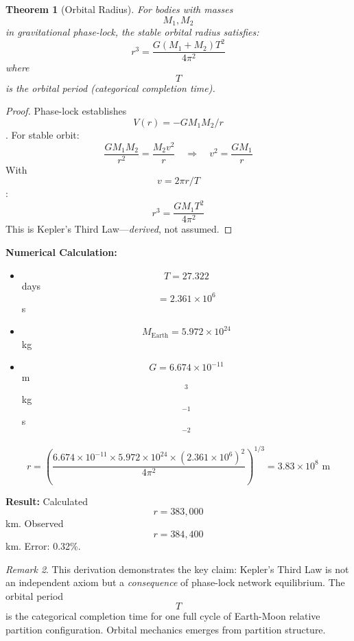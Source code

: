 \documentclass[11pt,twocolumn,a4paper]{article}
\newtheorem{theorem}{Theorem}[section]
\theoremstyle{definition}
\theoremstyle{remark}
\newtheorem{remark}[theorem]{Remark}
\begin{document}
\begin{theorem}[Orbital Radius]
\label{thm:orbit}
For bodies with masses $$M_1, M_2$$ in gravitational phase-lock, the stable orbital radius satisfies:
\begin{equation}
r^3 = \frac{G(M_1 + M_2) T^2}{4\pi^2}
\end{equation}
where $$T$$ is the orbital period (categorical completion time).
\end{theorem}

\begin{proof}
Phase-lock establishes $$V(r) = -GM_1 M_2/r$$. For stable orbit:
\begin{equation}
\frac{GM_1 M_2}{r^2} = \frac{M_2 v^2}{r} \quad \Rightarrow \quad v^2 = \frac{GM_1}{r}
\end{equation}
With $$v = 2\pi r/T$$:
\begin{equation}
r^3 = \frac{GM_1 T^2}{4\pi^2}
\end{equation}
This is Kepler's Third Law---\emph{derived}, not assumed.
\end{proof}

\textbf{Numerical Calculation:}
\begin{itemize}
    \item $$T = 27.322$$ days $$= 2.361 \times 10^6$$ s
    \item $$M_{\text{Earth}} = 5.972 \times 10^{24}$$ kg
    \item $$G = 6.674 \times 10^{-11}$$ m$$^3$$ kg$$^{-1}$$ s$$^{-2}$$
\end{itemize}

\begin{equation}
r = \left(\frac{6.674 \times 10^{-11} \times 5.972 \times 10^{24} \times (2.361 \times 10^6)^2}{4\pi^2}\right)^{1/3} = 3.83 \times 10^8 \text{ m}
\end{equation}

\textbf{Result:} Calculated $$r = 383{,}000$$ km. Observed $$r = 384{,}400$$ km. Error: 0.32\%.

\begin{remark}
This derivation demonstrates the key claim: Kepler's Third Law is not an independent axiom but a \emph{consequence} of phase-lock network equilibrium. The orbital period $$T$$ is the categorical completion time for one full cycle of Earth-Moon relative partition configuration. Orbital mechanics emerges from partition structure.
\end{remark}
\end{document}
